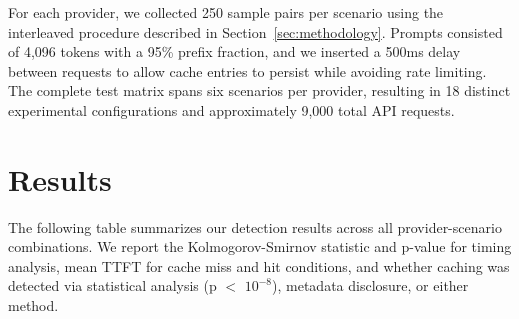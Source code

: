 \documentclass[conference]{IEEEtran}
\begin{document}
For each provider, we collected 250 sample pairs per scenario using the interleaved procedure described in Section~\ref{sec:methodology}.
Prompts consisted of 4,096 tokens with a 95\% prefix fraction, and we inserted a 500ms delay between requests to allow cache entries to persist while avoiding rate limiting.
The complete test matrix spans six scenarios per provider, resulting in 18 distinct experimental configurations and approximately 9,000 total API requests.

\section{Results}
\label{sec:results}

The following table summarizes our detection results across all provider-scenario combinations.
We report the Kolmogorov-Smirnov statistic and p-value for timing analysis, mean TTFT for cache miss and hit conditions, and whether caching was detected via statistical analysis (p $<$ $10^{-8}$), metadata disclosure, or either method.
\end{document}
